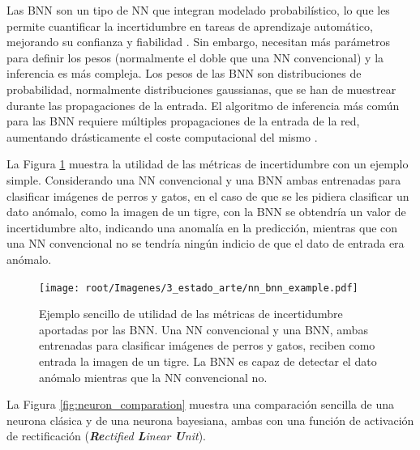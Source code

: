 Las BNN son un tipo de NN que integran modelado probabilístico, lo que les permite cuantificar la incertidumbre en tareas de aprendizaje automático, mejorando su confianza y fiabilidad \cite{bnn_hyper_uncertainty}. Sin embargo, necesitan más parámetros para definir los pesos (normalmente el doble que una NN convencional) y la inferencia es más compleja. Los pesos de las BNN son distribuciones de probabilidad, normalmente distribuciones gaussianas, que se han de muestrear durante las propagaciones de la entrada. El algoritmo de inferencia más común para las BNN requiere múltiples propagaciones de la entrada de la red, aumentando drásticamente el coste computacional del mismo \cite{bnn_theory_paper}. 

La Figura \ref{fig:bnn_vs_nn_example} muestra la utilidad de las métricas de incertidumbre con un ejemplo simple. Considerando una NN convencional y una BNN ambas entrenadas para clasificar imágenes de perros y gatos, en el caso de que se les pidiera clasificar un dato anómalo, como la imagen de un tigre, con la BNN se obtendría un valor de incertidumbre alto, indicando una anomalía en la predicción, mientras que con una NN convencional no se tendría ningún indicio de que el dato de entrada era anómalo.

\begin{figure}[h]
    \centering
    \texttt{[image: root/Imagenes/3\_estado\_arte/nn\_bnn\_example.pdf]}
    \caption{Ejemplo sencillo de utilidad de las métricas de incertidumbre aportadas por las BNN. Una NN convencional y una BNN, ambas entrenadas para clasificar imágenes de perros y gatos, reciben como entrada la imagen de un tigre. La BNN es capaz de detectar el dato anómalo mientras que la NN convencional no.}
    \label{fig:bnn_vs_nn_example}
\end{figure}

La Figura \ref{fig:neuron_comparation} muestra una comparación sencilla de una neurona clásica y de una neurona bayesiana, ambas con una función de activación de rectificación (\textit{\textbf{Re}ctified \textbf{L}inear \textbf{U}nit}).

